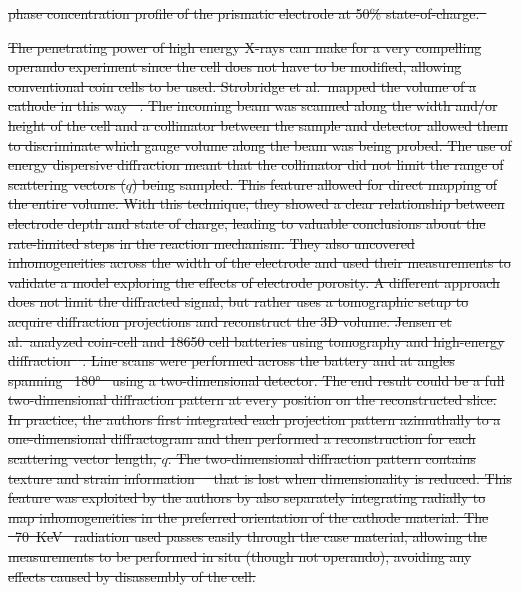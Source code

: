 \documentclass[journal=cmatex,manuscript=perspective]{achemso}
\providecommand{\DIFdeltex}[1]{{\protect\color{red}\sout{#1}}}                      %
\providecommand{\DIFdelbegin}{} %
\providecommand{\DIFdelFL}[1]{\DIFdel{#1}} %
\providecommand{\DIFdel}[1]{\texorpdfstring{\DIFdeltex{#1}}{}} %
\begin{document}
\DIFdelbegin %
{%
\DIFdelFL{ phase concentration profile of the prismatic
    electrode at 50\% state-of-charge.\mbox{%
\cite{liu2010}}%
}}

\DIFdel{The penetrating power of high energy X-rays can make for a very
compelling operando experiment since the cell does not have to be
modified, allowing conventional coin cells to be used. Strobridge et
al.\ mapped the volume of a \ce{LiFePO_4} cathode in this
way\mbox{%
\cite{strobridge2015}}%
. The incoming beam was scanned along the
width and/or height of the cell and a collimator between the sample
and detector allowed them to discriminate which gauge volume along the
beam was being probed. The use of energy dispersive diffraction meant
that the collimator did not limit the range of scattering vectors
($q$) being sampled. This feature allowed for direct mapping of the
entire volume. With this technique, they showed a clear relationship
between electrode depth and state of charge, leading to valuable
conclusions about the rate-limited steps in the reaction
mechanism. They also uncovered inhomogeneities across the width of the
electrode and used their measurements to validate a model exploring
the effects of electrode porosity. A different approach does not limit
the diffracted signal, but rather uses a tomographic setup to acquire
diffraction projections and reconstruct the 3D volume. Jensen et
al.\ analyzed coin-cell and 18650 cell batteries using tomography and
high-energy diffraction\mbox{%
\cite{jensen2015}}%
. Line scans were performed
across the battery and at angles spanning \mbox{%
\ang{180} }%
using a
two-dimensional detector. The end result could be a full
two-dimensional diffraction pattern at every position on the
reconstructed slice. In practice, the authors first integrated each
projection pattern azimuthally to a one-dimensional diffractogram and
then performed a reconstruction for each scattering vector length,
$q$. The two-dimensional diffraction pattern contains texture and
strain information\mbox{%
\cite{bobhe} }%
that is lost when dimensionality is
reduced. This feature was exploited by the authors by also separately
integrating radially to map inhomogeneities in the preferred
orientation of the \ce{LiCoO_2} cathode material. The \mbox{%
\SI{70}{KeV}
}%
radiation used passes easily through the case material, allowing the
measurements to be performed in situ (though not operando), avoiding
any effects caused by disassembly of the cell.
}%
\end{document}
